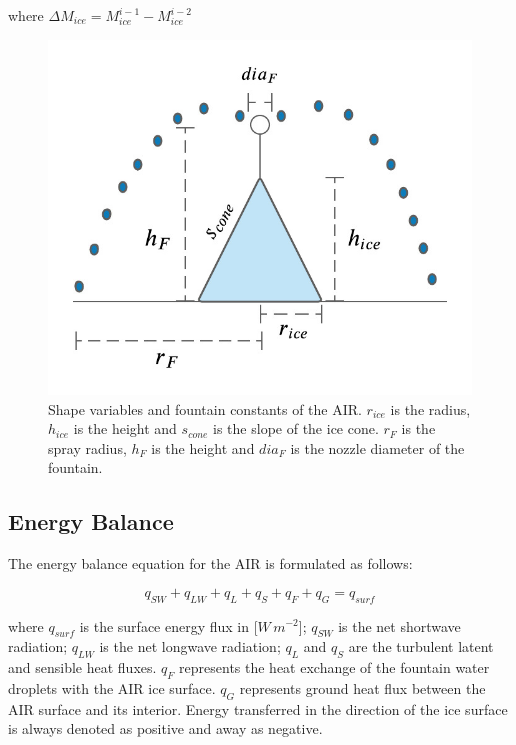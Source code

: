 \documentclass[utf8]{frontiersSCNS} %
\begin{document}
where $\Delta M_{ice} = M_{ice}^{i-1} - M_{ice}^{i-2}$

\begin{figure} \begin{center} \includegraphics[width=10
			cm]{Figures/Figure_5.jpg} \end{center} \caption{Shape variables and fountain constants of the AIR. $r_{ice}$ is
		the radius, $h_{ice}$ is the height and $s_{cone}$ is the slope of the ice cone. $r_F$ is the spray radius, $h_F$ is the
		height and $dia_F$ is the nozzle diameter of the fountain.} \label{fig:shape} \end{figure}

\subsection{Energy Balance} \label{section:EB}

The energy balance equation \citep{Hock_2005} for the AIR is formulated as follows:

\begin{equation} q_{SW} + q_{LW} + q_{L} + q_{S} + q_{F} + q_{G} = q_{surf} \label{eqn:EB} \end{equation}

where $q_{surf}$ is the surface energy flux in [$W\,m^{-2}$]; $q_{SW}$ is the net shortwave radiation; $q_{LW}$ is the
net longwave radiation; $q_{L}$ and $q_{S}$ are the turbulent latent and sensible heat fluxes. $q_{F}$ represents the heat
exchange of the fountain water droplets with the AIR ice surface. $q_{G}$ represents ground heat flux between the AIR
surface and its interior. Energy transferred in the direction of the ice surface is always denoted as positive and
away as negative.
\end{document}
